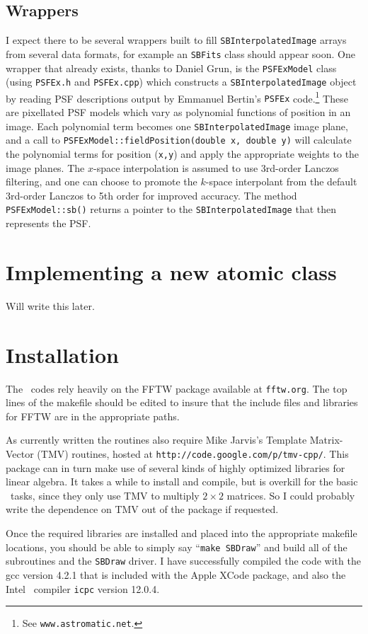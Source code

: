 \documentclass[11pt,preprint,flushrt]{aastex}
\begin{document}
\subsection{Wrappers}
I expect there to be several wrappers built to fill {\tt SBInterpolatedImage} arrays from several data formats, for example an {\tt SBFits} class should appear soon.  One wrapper that already exists, thanks to Daniel Grun, is the {\tt PSFExModel} class (using {\tt PSFEx.h} and {\tt PSFEx.cpp}) which constructs a {\tt SBInterpolatedImage} object by reading PSF descriptions output by Emmanuel Bertin's {\tt PSFEx} code.\footnote{See {\tt www.astromatic.net}.}  These are pixellated PSF models which vary as polynomial functions of position in an image.  Each polynomial term becomes one {\tt SBInterpolatedImage} image plane, and a call to {\tt PSFExModel::fieldPosition(double x, double y)} will calculate the polynomial terms for position ({\tt x,y}) and apply the appropriate weights to the image planes.  The $x$-space interpolation is assumed to use 3rd-order Lanczos filtering, and one can choose to promote the $k$-space interpolant from the default 3rd-order Lanczos to 5th order for improved accuracy.  The method {\tt PSFExModel::sb()} returns a pointer to the {\tt SBInterpolatedImage} that then represents the PSF.

\section{Implementing a new atomic class}
Will write this later.

\section{Installation}
The \sbp\ codes rely heavily on the FFTW package available at {\tt fftw.org}.  The top lines of the makefile should be edited to insure that the include files and libraries for FFTW are in the appropriate paths.

As currently written the routines also require Mike Jarvis's Template Matrix-Vector (TMV) routines, hosted at {\tt http://code.google.com/p/tmv-cpp/}.  This package can in turn make use of several kinds of highly optimized libraries for linear algebra.  It takes a while to install and compile, but is overkill for the basic \sbp\ tasks, since they only use TMV to multiply $2\times2$ matrices.  So I could probably write the dependence on TMV out of the package if requested.

Once the required libraries are installed and placed into the appropriate makefile locations, you should be able to simply say ``{\tt make SBDraw}''  and build all of the subroutines and the {\tt SBDraw} driver.  I have successfully compiled the code with the gcc version 4.2.1 that is included with the Apple XCode package, and also the Intel \cpp\ compiler {\tt icpc} version 12.0.4.
\end{document}
